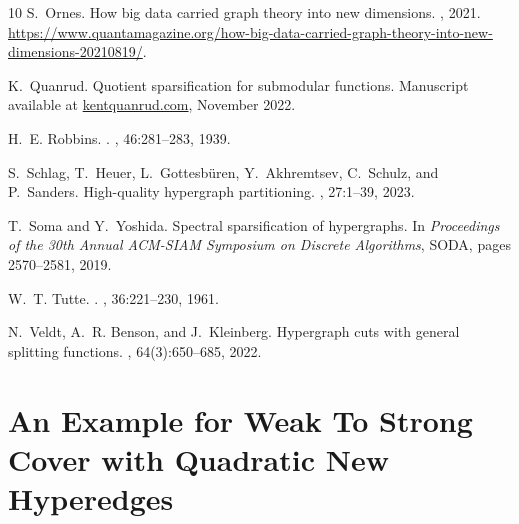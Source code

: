 \documentclass{article}
\def\Cref#1{<#1>}%
\newcommand{\shubhang}[1]{{\color{blue}[{\tiny Shubhang: \bf #1}]\marginpar{\color{blue}*}}}
\begin{document}
\begin{thebibliography}{10}
S.~Ornes.
\newblock How big data carried graph theory into new dimensions.
, 2021.
\newblock \url{https://www.quantamagazine.org/how-big-data-carried-graph-theory-into-new-dimensions-20210819/}.

K.~Quanrud.
\newblock Quotient sparsification for submodular functions.
\newblock Manuscript available at \url{kentquanrud.com}, November 2022.

H.~E. Robbins.
.
, 46:281--283, 1939.

S.~Schlag, T.~Heuer, L.~Gottesb{\"u}ren, Y.~Akhremtsev, C.~Schulz, and P.~Sanders.
\newblock High-quality hypergraph partitioning.
, 27:1--39, 2023.

T.~Soma and Y.~Yoshida.
\newblock Spectral sparsification of hypergraphs.
\newblock In {\em Proceedings of the 30th Annual ACM-SIAM Symposium on Discrete Algorithms}, SODA, pages 2570--2581, 2019.

W.~T. Tutte.
.
, 36:221--230, 1961.

N.~Veldt, A.~R. Benson, and J.~Kleinberg.
\newblock Hypergraph cuts with general splitting functions.
, 64(3):650--685, 2022.

\end{thebibliography}

\appendix
\section{An Example for Weak To Strong Cover with Quadratic New Hyperedges}\label{sec:appendix:tight-example-weak-to-strong}
\end{document}

